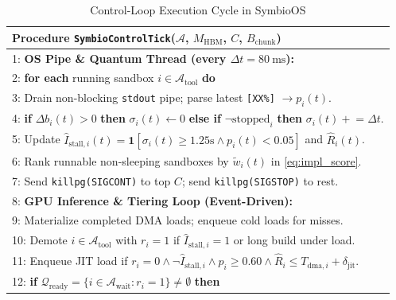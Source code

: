 \documentclass[10pt,journal,compsoc]{IEEEtran}
\theoremstyle{definition}
\theoremstyle{remark}
\newcommand{\SymbioOS}{\textup{\textsc{SymbioOS}}}
\def\SymbioOS{SymbioOS}%
\begin{document}
\begin{table}[!t]
\centering
\caption{Control-Loop Execution Cycle in \SymbioOS{}}
\label{tab:alg_loop}
\setlength{\tabcolsep}{4pt}
\begin{tabular}{p{}}
\toprule
\textbf{Procedure} \texttt{SymbioControlTick}($\mathcal{A}$, $M_{\mathrm{HBM}}$, $C$, $B_{\mathrm{chunk}}$) \\
\midrule
1: \textbf{OS Pipe \& Quantum Thread (every $\Delta t = 80~\mathrm{ms}$):} \\
2: \hspace{0.8em}\textbf{for each} running sandbox $i \in \mathcal{A}_{\mathrm{tool}}$ \textbf{do} \\
3: \hspace{1.6em}Drain non-blocking \texttt{stdout} pipe; parse latest \texttt{[XX\%]} $\to p_i(t)$. \\
4: \hspace{1.6em}\textbf{if} $\Delta b_i(t) > 0$ \textbf{then} $\sigma_i(t) \gets 0$ \textbf{else if} $\neg\mathrm{stopped}_i$ \textbf{then} $\sigma_i(t) \mathrel{+}= \Delta t$. \\
5: \hspace{1.6em}Update $\hat{I}_{\mathrm{stall},i}(t) = \mathbf{1}[\sigma_i(t) \ge 1.25\mathrm{s} \land p_i(t) < 0.05]$ and $\hat{R}_i(t)$. \\
6: \hspace{0.8em}Rank runnable non-sleeping sandboxes by $\tilde{w}_i(t)$ in \eqref{eq:impl_score}. \\
7: \hspace{0.8em}Send \texttt{killpg(SIGCONT)} to top $C$; send \texttt{killpg(SIGSTOP)} to rest. \\[2pt]
8: \textbf{GPU Inference \& Tiering Loop (Event-Driven):} \\
9: \hspace{0.8em}Materialize completed DMA loads; enqueue cold loads for misses. \\
10: \hspace{0.4em}Demote $i \in \mathcal{A}_{\mathrm{tool}}$ with $r_i{=}1$ if $\hat{I}_{\mathrm{stall},i}{=}1$ or long build under load. \\
11: \hspace{0.4em}Enqueue JIT load if $r_i{=}0 \land \neg\hat{I}_{\mathrm{stall},i} \land p_i \ge 0.60 \land \hat{R}_i \le T_{\mathrm{dma},i}{+}\delta_{\mathrm{jit}}$. \\
12: \hspace{0.4em}\textbf{if} $\mathcal{Q}_{\mathrm{ready}} = \{i \in \mathcal{A}_{\mathrm{wait}} : r_i = 1\} \neq \emptyset$ \textbf{then} \\

\end{tabular}
\end{table}
\end{document}
